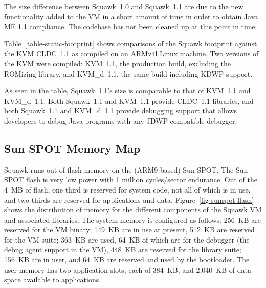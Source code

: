 \documentclass{sigplanconf}
\def\remark#1{\marginpar{\raggedright\hbadness=10000
        \def\baselinestretch{0.8}\scriptsize
        \it #1\par}}
\begin{document}
The size difference between Squawk~1.0 and Squawk~1.1 are due to the 
new functionality added to the VM in a short amount of time in order
to obtain Java ME 1.1 compliance.  
The codebase has not been cleaned up at this point in time. 

Table~\ref{table-static-footprint} shows comparisons of the Squawk 
footprint against the KVM CLDC~1.1 as compiled on an ARMv4l Linux
machine.  
Two versions of the KVM were compiled: KVM~1.1, the production build, 
excluding the ROMizing library, and KVM\_d~1.1, the same build including
KDWP support. 
%
%
%
%

As seen in the table, Squawk~1.1's size is comparable to that of KVM~1.1 and 
KVM\_d~1.1.
Both Squawk~1.1 and KVM~1.1 provide CLDC~1.1 libraries, and both Squawk~1.1 and 
KVM\_d~1.1 provide debugging support that allows developers to debug Java 
programs with any JDWP-compatible debugger.


\subsection{Sun SPOT Memory Map}

Squawk runs out of flash memory on the (ARM9-based) Sun SPOT. 
The Sun SPOT flash is very low power with 1 million cycles/sector endurance.  
Out of the 4~MB of flash, one third is reserved for system code,
not all of which is in use, and two thirds are reserved for applications
and data.
Figure~\ref{fig-sunspot-flash} shows the distribution of memory for
the different components of the Squawk VM and associated libraries.
The system memory is configured as follows:
256~KB are reserved for the VM binary; 149~KB are in use at present,
512~KB are reserved for the VM suite; 363~KB are used, 64~KB of which
are for the debugger (the debug agent support in the VM),
448~KB are reserved for the library suite; 156~KB are in user,
and 64~KB are reserved and used by the bootloader.
The user memory has two application slots, each of 384~KB, and 
2,040~KB of data space available to applications. 
\end{document}
